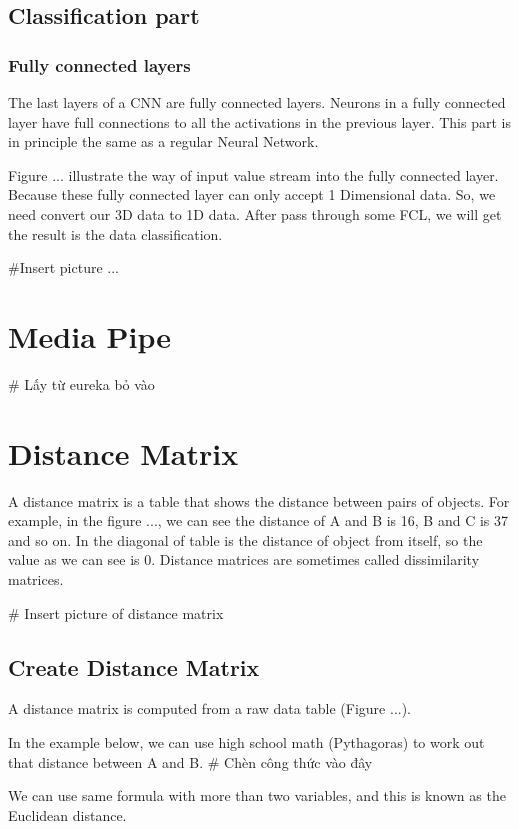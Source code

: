     \subsection{ Classification part }
      \subsubsection{ Fully connected layers }
        The last layers of a CNN are fully connected layers. Neurons in a 
        fully connected layer have full connections to all the activations in the previous 
        layer. This part is in principle the same as a regular Neural Network.

        Figure ... illustrate the way of input value stream into the fully connected layer.
        Because these fully connected layer can only accept 1 Dimensional data. So, we need convert our 3D
        data to 1D data. After pass through some FCL, we will get the result is the data
        classification.

        #Insert picture ...
  \section{ Media Pipe }
    # Lấy từ eureka bỏ vào


  \section{ Distance Matrix }
    A distance matrix is a table that shows the distance between pairs of objects.
    For example, in the figure ..., we can see the distance of A and B is 16, B and C is 37
    and so on. In the diagonal of table is the distance of object from itself, so the value
    as we can see is 0. Distance matrices are sometimes called dissimilarity matrices.

    # Insert picture of distance matrix

    \subsection{ Create Distance Matrix }
      A distance matrix is computed from a raw data table (Figure ...). 
      
      In the example below, we can use high school math (Pythagoras) to work out 
      that distance between A and B. 
        # Chèn công thức vào đây
      
      We can use same formula with more than two variables, and this is known as 
      the Euclidean distance.

